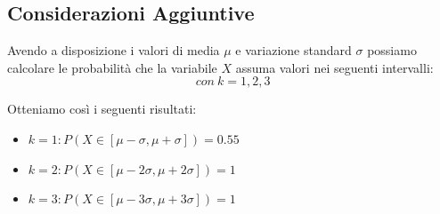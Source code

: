 \subsection{Considerazioni Aggiuntive}
Avendo a disposizione i valori di media $\mu$ e variazione standard $\sigma$ possiamo calcolare le probabilità che la variabile $X$ assuma valori nei seguenti intervalli:
\begin{equation*}
	[\mu-k\sigma, \mu+k\sigma]\ con\ k=1,2,3
\end{equation*} 

Otteniamo così i seguenti risultati:
\begin{itemize}
    \item $k=1: P(X \in [\mu-\sigma, \mu+\sigma]) = 0.55$
    \item $k=2: P(X \in [\mu-2\sigma, \mu+2\sigma]) = 1$
    \item $k=3: P(X \in [\mu-3\sigma, \mu+3\sigma]) = 1$
\end{itemize}





